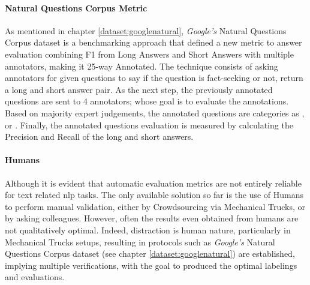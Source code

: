 \paragraph{Natural Questions Corpus Metric}
As mentioned in chapter \ref{dataset:googlenatural}, \textit{Google's} Natural Questions Corpus dataset \autocite{paper:google-natural-questions} is a benchmarking approach that defined a new metric to answer evaluation combining F1 from Long Answers and Short Answers with multiple annotators, making it 25-way Annotated. The technique consists of asking annotators for given questions to say if the question is fact-seeking or not, return a long and short answer pair. As the next step, the previously annotated questions are sent to 4 annotators; whose goal is to evaluate the annotations. Based on majority expert judgements, the annotated questions are categories as ,  or . Finally, the annotated questions evaluation is measured by calculating the Precision and Recall of the long and short answers.

\paragraph{Humans}
Although it is evident that automatic evaluation metrics are not entirely reliable for text related \gls{nlp} tasks. The only available solution so far is the use of Humans to perform manual validation, either by Crowdsourcing via Mechanical Trucks, or by asking colleagues. However, often the results even obtained from humans are not qualitatively optimal. Indeed,  distraction is human nature, particularly in Mechanical Trucks setups, resulting in protocols such as \textit{Google's} Natural Questions Corpus dataset (see chapter \ref{dataset:googlenatural}) are established, implying multiple verifications, with the goal to produced the optimal labelings and evaluations.

